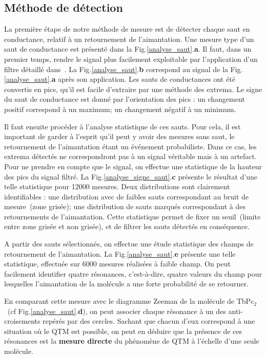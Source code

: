 \subsection{Méthode de détection}
La première étape de notre méthode de mesure est de détecter chaque saut en conductance, relatif à un retournement de l'aimantation. Une mesure type d'un saut de conductance est présenté dans la Fig.\ref{analyse_saut}.\textbf{a}. Il faut, dans un premier temps, rendre le signal plus facilement exploitable par l'application d'un filtre détaillé dans~\cite{Y.1995}. La Fig.\ref{analyse_saut}.\textbf{b} correspond au signal de la Fig.\ref{analyse_saut}.\textbf{a} après son application. Les sauts de conductances ont été convertis en pics, qu'il est facile d'extraire par une méthode des extrema. Le signe du saut de conductance est donné par l'orientation des pics : un changement positif correspond à un maximum; un changement négatif à un minimum.

Il faut ensuite procéder à l'analyse statistique de ces sauts. Pour cela, il est important de garder à l'esprit qu'il peut y avoir des mesures sans saut, le retournement de l'aimantation étant un événement probabiliste. Dans ce cas, les extrema détectés ne correspondront pas à un signal véritable mais à un artefact. Pour ne prendre en compte que le signal, on effectue une statistique de la hauteur des pics du signal filtré. La Fig.\ref{analyse_signe_saut}.\textbf{c} présente le résultat d'une telle statistique pour 12000 mesures. Deux distributions sont clairement identifiables : une distribution avec de faibles sauts correspondant au bruit de mesure~(zone grisée); une distribution de sauts marqués correspondant à des retournements de l'aimantation. Cette statistique permet de fixer un seuil~(limite entre zone grisée et non grisée), et de filtrer les sauts détectés en conséquence.

A partir des sauts sélectionnés, on effectue une étude statistique des champs de retournement de l'aimantation. La Fig.\ref{analyse_saut}.\textbf{e} présente une telle statistique, effectuée sur 6000 mesures réalisées à faible champ. On peut facilement identifier quatre résonances, c'est-à-dire, quatre valeurs du champ pour lesquelles l'aimantation de la molécule a une forte probabilité de se retourner. 

En comparant cette mesure avec le diagramme Zeeman de la molécule de TbPc$_2$~(cf Fig.\ref{analyse_saut}.\textbf{d}), on peut associer chaque résonance à un des anti-croisements repérés par des cercles. Sachant que chacun d'eux correspond à une situation où le QTM est possible, on peut en déduire que la présence de ces résonances est la \textbf{mesure directe} du phénomène de QTM à l'échelle d'une seule molécule. 

